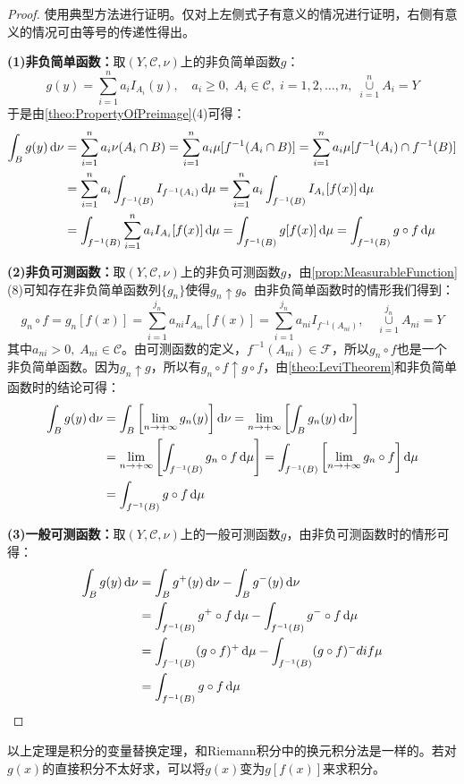 \begin{proof}
	使用典型方法进行证明。仅对上左侧式子有意义的情况进行证明，右侧有意义的情况可由等号的传递性得出。\par
	\textbf{(1)非负简单函数：}取$(Y,\mathscr{C},\nu)$上的非负简单函数$g$：
	\begin{equation*}
		g(y)=\sum_{i=1}^{n}a_iI_{A_i}(y),\quad a_i\geqslant0,\;A_i\in\mathscr{C},\;i=1,2,\dots,n,\;\underset{i=1}{\overset{n}{\cup}}A_i=Y
	\end{equation*}
	于是由\cref{theo:PropertyOfPreimage}(4)可得：
	\begin{align*}
		\int_{B}g(y)\mathop{}\!\mathrm{d}\nu&=\sum_{i=1}^{n}a_i\nu(A_i\cap B)=\sum_{i=1}^{n}a_i\mu[f^{-1}(A_i\cap B)]=\sum_{i=1}^{n}a_i\mu[f^{-1}(A_i)\cap f^{-1}(B)] \\
		&=\sum_{i=1}^{n}a_i\int_{f^{-1}(B)}I_{f^{-1}(A_i)}\mathop{}\!\mathrm{d}\mu=\sum_{i=1}^{n}a_i\int_{f^{-1}(B)}I_{A_i}[f(x)]\mathop{}\!\mathrm{d}\mu \\
		&=\int_{f^{-1}(B)}\sum_{i=1}^{n}a_iI_{A_i}[f(x)]\mathop{}\!\mathrm{d}\mu=\int_{f^{-1}(B)}g[f(x)]\mathop{}\!\mathrm{d}\mu=\int_{f^{-1}(B)}g\circ f\mathop{}\!\mathrm{d}\mu
	\end{align*}\par
	\textbf{(2)非负可测函数：}取$(Y,\mathscr{C},\nu)$上的非负可测函数$g$，由\cref{prop:MeasurableFunction}(8)可知存在非负简单函数列$\{g_n\}$使得$g_n\uparrow g$。由非负简单函数时的情形我们得到：
	\begin{equation*}
		g_n\circ f=g_n[f(x)]=\sum_{i=1}^{j_n}a_{ni}I_{A_{ni}}[f(x)]=\sum_{i=1}^{j_n}a_{ni}I_{f^{-1}(A_{ni})},\quad\underset{i=1}{\overset{j_n}{\cup}}A_{ni}=Y
	\end{equation*}
	其中$a_{ni}>0,\;A_{ni}\in\mathscr{C}$。由可测函数的定义，$f^{-1}(A_{ni})\in\mathscr{F}$，所以$g_n\circ f$也是一个非负简单函数。因为$g_n\uparrow g$，所以有$g_n\circ f\uparrow g\circ f$，由\cref{theo:LeviTheorem}和非负简单函数时的结论可得：
	\begin{align*}
		\int_{B}g(y)\mathop{}\!\mathrm{d}\nu&=\int_{B}\left[\lim_{n\to+\infty}g_n(y)\right]\mathop{}\!\mathrm{d}\nu
		=\lim_{n\to+\infty}\left[\int_{B}g_n(y)\mathop{}\!\mathrm{d}\nu\right] \\
		&=\lim_{n\to+\infty}\left[\int_{f^{-1}(B)}g_n\circ f\mathop{}\!\mathrm{d}\mu\right]
		=\int_{f^{-1}(B)}\left[\lim_{n\to+\infty}g_n\circ f\right]\mathop{}\!\mathrm{d}\mu \\
		&=\int_{f^{-1}(B)}g\circ f\mathop{}\!\mathrm{d}\mu
	\end{align*}\par
	\textbf{(3)一般可测函数：}取$(Y,\mathscr{C},\nu)$上的一般可测函数$g$，由非负可测函数时的情形可得：
	\begin{align*}
		\int_{B}g(y)\mathop{}\!\mathrm{d}\nu&=\int_{B}g^+(y)\mathop{}\!\mathrm{d}\nu-\int_{B}g^-(y)\mathop{}\!\mathrm{d}\nu \\
		&=\int_{f^{-1}(B)}g^+\circ f\mathop{}\!\mathrm{d}\mu-\int_{f^{-1}(B)}g^-\circ f\mathop{}\!\mathrm{d}\mu \\
		&=\int_{f^{-1}(B)}(g\circ f)^+\mathop{}\!\mathrm{d}\mu-\int_{f^{-1}(B)}(g\circ f)^-dif\mu \\
		&=\int_{f^{-1}(B)}g\circ f\mathop{}\!\mathrm{d}\mu\qedhere
	\end{align*}
\end{proof}
\begin{note}
	以上定理是积分的变量替换定理，和Riemann积分中的换元积分法是一样的。若对$g(x)$的直接积分不太好求，可以将$g(x)$变为$g[f(x)]$来求积分。
\end{note}